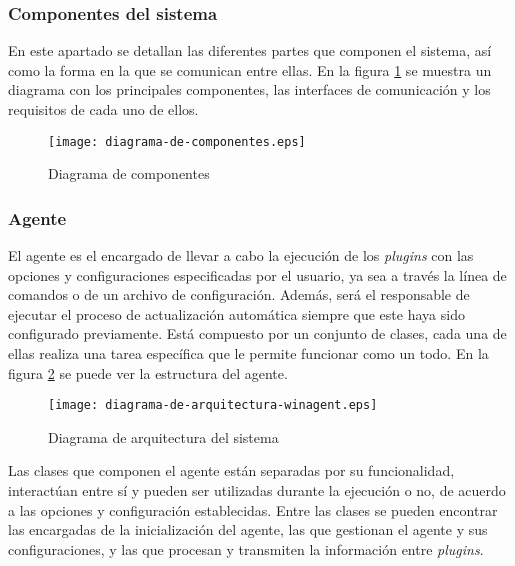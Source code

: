         \subsubsection{Componentes del sistema}
            En este apartado se detallan las diferentes partes que componen el sistema, así como la forma en la que se comunican entre ellas. En la figura \ref{fig:diagrama-de-componentes} se muestra un diagrama con los principales componentes, las interfaces de comunicación y los requisitos de cada uno de ellos.

            \begin{figure}[h!]
            \centering
                \texttt{[image: diagrama-de-componentes.eps]}
                \caption{Diagrama de componentes}
                \label{fig:diagrama-de-componentes}
            \end{figure}

        \subsubsection{Agente}
            El agente es el encargado de llevar a cabo la ejecución de los \textit{plugins} con las opciones y configuraciones especificadas por el usuario, ya sea a través la línea de comandos o de un archivo de configuración. Además, será el responsable de ejecutar el proceso de actualización automática siempre que este haya sido configurado previamente. Está compuesto por un conjunto de clases, cada una de ellas realiza una tarea específica que le permite funcionar como un todo. En la figura \ref{fig:diagrama-de-arquitectura-winagent} se puede ver la estructura del agente.
            
            \begin{figure}[h!]
            \centering
                \texttt{[image: diagrama-de-arquitectura-winagent.eps]}
                \caption{Diagrama de arquitectura del sistema}
                \label{fig:diagrama-de-arquitectura-winagent}
            \end{figure}

            Las clases que componen el agente están separadas por su funcionalidad, interactúan entre sí y pueden ser utilizadas durante la ejecución o no, de acuerdo a las opciones y configuración establecidas. Entre las clases se pueden encontrar las encargadas de la inicialización del agente, las que gestionan el agente y sus configuraciones, y las que procesan y transmiten la información entre \textit{plugins}.
            
